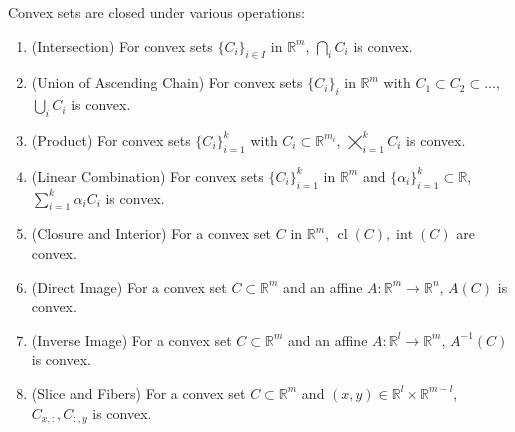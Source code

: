 \begin{prop}\label{prop:011-conv-yoga}
	Convex sets are closed under various operations:
	\begin{enumerate}[label=(\alph*)]
		\item (Intersection) For convex sets $\{C_i\}_{i\in I}$ in $\mathbb{R}^m$, $\bigcap_iC_i$ is convex.
		\item (Union of Ascending Chain) For convex sets $\{C_i\}_{i}$ in $\mathbb{R}^m$ with $C_1\subset C_2\subset\dotsc$, $\bigcup_iC_i$ is convex.
		\item (Product) For convex sets $\{C_i\}_{i=1}^k$ with $C_i\subset \mathbb{R}^{m_i}$, $\bigtimes_{i=1}^kC_i$ is convex.
		\item (Linear Combination) For convex sets $\{C_i\}_{i=1}^k$ in $\mathbb{R}^m$ and $\{\alpha_i\}_{i=1}^k\subset \mathbb{R}$, $\sum_{i=1}^k\alpha_iC_i$ is convex.
		\item (Closure and Interior) For a convex set $C$ in $\mathbb{R}^m$, $\operatorname{cl}(C),\operatorname{int}(C)$ are convex.
		\item (Direct Image) For a convex set $C\subset \mathbb{R}^m$ and an affine $A:\mathbb{R}^m\to \mathbb{R}^n$, $A(C)$ is convex.
		\item (Inverse Image) For a convex set $C\subset \mathbb{R}^m$ and an affine $A:\mathbb{R}^l\to \mathbb{R}^m$, $A^{-1}(C)$ is convex.
		\item (Slice and Fibers) For a convex set $C\subset \mathbb{R}^m$ and $(x,y)\in \mathbb{R}^l\times \mathbb{R}^{m-l}$, $C_{x,:},C_{:,y}$ is convex.
	\end{enumerate}
\end{prop}
